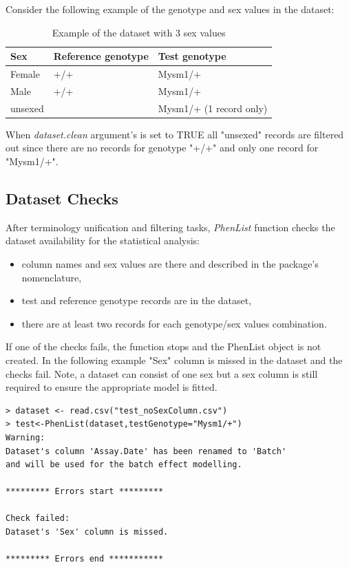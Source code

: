 \documentclass[12pt,a4paper]{article}
\begin{document}
Consider the following example of the genotype and sex values in the dataset:
\begin{table}[!h]
\begin{center}
\begin{tabular}{| l | l | l | }
  \hline
Sex&Reference genotype&Test genotype\\\hline
Female&+\slash +&Mysm1\slash +\\
Male&+\slash +&Mysm1\slash +\\
unsexed& &Mysm1\slash + (1 record only)\\
\hline  
\end{tabular}
\caption{Example of the dataset with 3 sex values}\label{table:04}
\end{center}
\end{table}

When \textit{dataset.clean} argument's is set to TRUE all "unsexed" records are filtered out since there are no records for genotype "+\slash +" and only one record for "Mysm1\slash +".

\subsection{Dataset Checks}
\label{section:DatasetChecks}
After terminology unification and filtering tasks, \textit{PhenList} function checks the dataset availability for the statistical analysis: 
\begin{itemize}
\item column names and sex values are there and described in the package's nomenclature, 
\item test and reference genotype records are in the dataset, 
\item there are at least two records for each genotype\slash sex values combination.
\end{itemize}

If one of the checks fails, the function stops and the PhenList object is not created. In the following example "Sex" column is missed in the dataset and the checks fail. 
Note, a dataset can consist of one sex but a sex column is still required to ensure the appropriate model is fitted.
\begingroup
    \fontsize{8pt}{12pt}\selectfont
\begin{verbatim}
> dataset <- read.csv("test_noSexColumn.csv")
> test<-PhenList(dataset,testGenotype="Mysm1/+")
Warning:
Dataset's column 'Assay.Date' has been renamed to 'Batch' 
and will be used for the batch effect modelling.

********* Errors start *********

Check failed:
Dataset's 'Sex' column is missed.

********* Errors end ***********
\end{verbatim}
\endgroup
\end{document}
